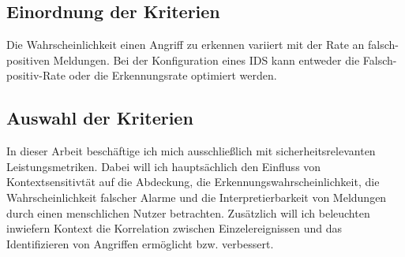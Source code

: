 
\subsection{Einordnung der Kriterien}
Die Wahrscheinlichkeit einen Angriff zu erkennen variiert mit der Rate an falsch-positiven Meldungen. Bei der Konfiguration eines IDS kann entweder die Falsch-positiv-Rate oder die Erkennungsrate optimiert werden.

\subsection{Auswahl der Kriterien}
\cite{milenkoski_evaluating_2015}
In dieser Arbeit beschäftige ich mich ausschließlich mit sicherheitsrelevanten Leistungsmetriken. Dabei will ich hauptsächlich den Einfluss von Kontextsensitivtät auf die Abdeckung, die Erkennungswahrscheinlichkeit, die Wahrscheinlichkeit  falscher Alarme und die Interpretierbarkeit von Meldungen durch einen menschlichen Nutzer betrachten. Zusätzlich will ich beleuchten inwiefern Kontext die Korrelation zwischen Einzelereignissen und das Identifizieren von Angriffen ermöglicht bzw. verbessert.
